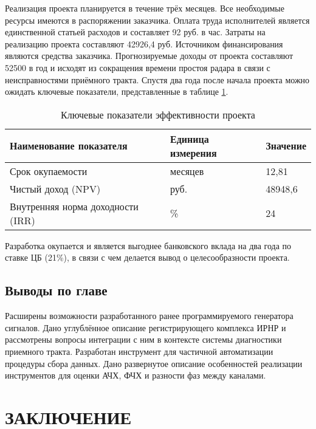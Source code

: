 \documentclass{report}
\begin{document}
Реализация проекта планируется в течение трёх месяцев. Все необходимые ресурсы имеются в распоряжении заказчика. Оплата труда исполнителей является единственной статьей расходов и составляет 92 руб. в час. Затраты на реализацию проекта составляют 42926,4 руб. Источником финансирования являются средства заказчика. Прогнозируемые доходы от проекта составляют 52500 в год и исходят из сокращения времени простоя радара в связи с неисправностями приёмного тракта. Спустя два года после начала проекта можно ожидать ключевые показатели, представленные в таблице \ref{table:econ1}.

\begin{table}[H]
    \centering   %
    \caption{Ключевые показатели эффективности проекта}    %
    \begin{tabular}{|m{5cm}|m{5cm}|m{5cm}|}        %
    \hline   %
    \centering\arraybackslash Наименование показателя &  \centering\arraybackslash Единица измерения & \centering\arraybackslash Значение \\ \hline
    Срок окупаемости & месяцев & 12,81 \\ \hline
    Чистый доход (NPV) & руб. & 48948,6 \\ \hline
    Внутренняя норма доходности (IRR) & \% & 24 \\ \hline
    \end{tabular}
    \label{table:econ1}
\end{table}

Разработка окупается и является выгоднее банковского вклада на два года по ставке ЦБ (21\%), в связи с чем делается вывод о целесообразности проекта.

\section*{Выводы по главе}
Расширены возможности разработанного ранее программируемого генератора сигналов. Дано углублённое описание регистрирующего комплекса ИРНР и рассмотрены вопросы интеграции с ним в контексте системы диагностики приемного тракта. Разработан инструмент для частичной автоматизации процедуры сбора данных. Дано развернутое описание особенностей реализации инструментов для оценки АЧХ, ФЧХ и разности фаз между каналами.

\chapter*{ЗАКЛЮЧЕНИЕ}
\end{document}
